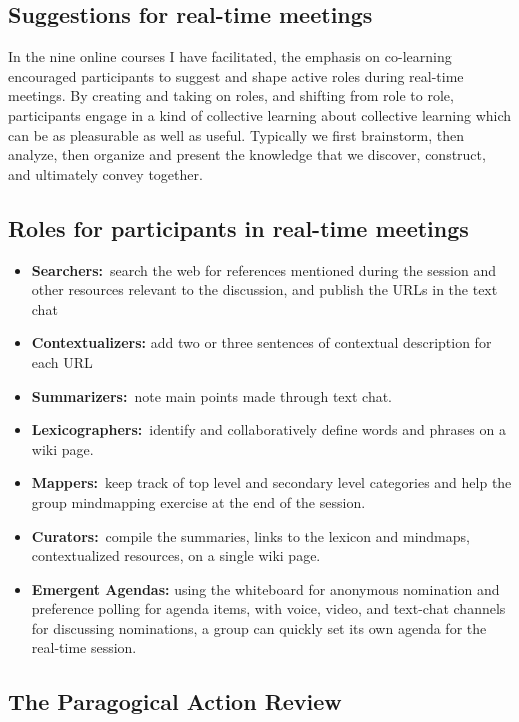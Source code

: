 \subsection{Suggestions for real-time meetings}

In the nine online courses I have facilitated, the emphasis on
co-learning encouraged participants to suggest and shape active roles
during real-time meetings. By creating and taking on roles, and shifting
from role to role, participants engage in a kind of collective learning
about collective learning which can be as pleasurable as well as useful.
Typically we first brainstorm, then analyze, then organize and present
the knowledge that we discover, construct, and ultimately convey
together.

\subsection{Roles for participants in real-time meetings}

\begin{itemize}
\itemsep1pt\parskip0pt
\item
  \textbf{Searchers:}~search the web for references mentioned during the
  session and other resources relevant to the discussion, and publish
  the URLs in the text chat
\item
  \textbf{Contextualizers:} add two or three sentences of contextual
  description for each URL
\item
  \textbf{Summarizers:}~note main points made through text chat.
\item
  \textbf{Lexicographers:}~identify and collaboratively define words and
  phrases on a wiki page.
\item
  \textbf{Mappers:}~keep track of top level and secondary level
  categories and help the group mindmapping exercise at the end of the
  session.
\item
  \textbf{Curators:}~compile the summaries, links to the lexicon and
  mindmaps, contextualized resources, on a single wiki page.
\item
  \textbf{Emergent Agendas:} using the whiteboard for anonymous
  nomination and preference polling for agenda items, with voice, video,
  and text-chat channels for discussing nominations, a group can quickly
  set its own agenda for the real-time session.
\end{itemize}

\subsection{The Paragogical Action Review}


